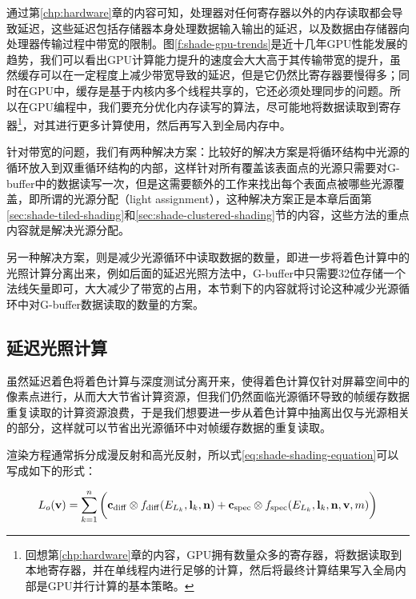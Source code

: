 通过第\ref{chp:hardware}章的内容可知，处理器对任何寄存器以外的内存读取都会导致延迟，这些延迟包括存储器本身处理数据输入输出的延迟，以及数据由存储器向处理器传输过程中带宽的限制。图\ref{f:shade-gpu-trends}是近十几年GPU性能发展的趋势，我们可以看出GPU计算能力提升的速度会大大高于其传输带宽的提升，虽然缓存可以在一定程度上减少带宽导致的延迟，但是它仍然比寄存器要慢得多；同时在GPU中，缓存是基于内核内多个线程共享的，它还必须处理同步的问题。所以在GPU编程中，我们要充分优化内存读写的算法，尽可能地将数据读取到寄存器\footnote{回想第\ref{chp:hardware}章的内容，GPU拥有数量众多的寄存器，将数据读取到本地寄存器，并在单线程内进行足够的计算，然后将最终计算结果写入全局内部是GPU并行计算的基本策略。}，对其进行更多计算使用，然后再写入到全局内存中。

针对带宽的问题，我们有两种解决方案：比较好的解决方案是将循环结构中光源的循环放入到双重循环结构的内部，这样针对所有覆盖该表面点的光源只需要对G-buffer中的数据读写一次，但是这需要额外的工作来找出每个表面点被哪些光源覆盖，即所谓的光源分配（light assignment），这种解决方案正是本章后面第\ref{sec:shade-tiled-shading}和\ref{sec:shade-clustered-shading}节的内容，这些方法的重点内容就是解决光源分配。

另一种解决方案，则是减少光源循环中读取数据的数量，即进一步将着色计算中的光照计算分离出来，例如后面的延迟光照方法中，G-buffer中只需要32位存储一个法线矢量即可，大大减少了带宽的占用，本节剩下的内容就将讨论这种减少光源循环中对G-buffer数据读取的数量的方案。





\subsection{延迟光照计算}\label{sec:shade-deferred-lighting}
虽然延迟着色将着色计算与深度测试分离开来，使得着色计算仅针对屏幕空间中的像素点进行，从而大大节省计算资源，但我们仍然面临光源循环导致的帧缓存数据重复读取的计算资源浪费，于是我们想要进一步从着色计算中抽离出仅与光源相关的部分，这样就可以节省出光源循环中对帧缓存数据的重复读取。

渲染方程通常拆分成漫反射和高光反射，所以式\ref{eq:shade-shading-equation}可以写成如下的形式：

\begin{equation}
	L_o(\mathbf{v})=\sum^{n}_{k=1}\bigg(\mathbf{c}_{\rm diff}\otimes f_{\rm diff}(E_{L_k},\mathbf{l}_k,\mathbf{n})+\mathbf{c}_{\rm spec}\otimes f_{\rm spec}(E_{L_k},\mathbf{l}_k,\mathbf{n},\mathbf{v},m)\bigg)
\end{equation}

